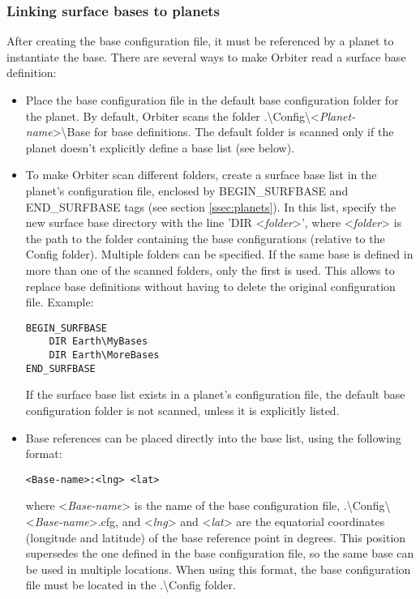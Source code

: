 \documentclass[Orbiter Developer Manual.tex]{subfiles}
\begin{document}
\subsubsection*{Linking surface bases to planets}
After creating the base configuration file, it must be referenced by a planet to instantiate the base. There are several ways to make Orbiter read a surface base definition:

\begin{itemize}
\item Place the base configuration file in the default base configuration folder for the planet. By default, Orbiter scans the folder .\textbackslash Config\textbackslash <\textit{Planet-name}>\textbackslash Base for base definitions. The default folder is scanned only if the planet doesn't explicitly define a base list (see below).
\item To make Orbiter scan different folders, create a surface base list in the planet's configuration file, enclosed by BEGIN\_SURFBASE and END\_SURFBASE tags (see section \ref{ssec:planets}). In this list, specify the new surface base directory with the line 'DIR <\textit{folder}>', where <\textit{folder}> is the path to the folder containing the base configurations (relative to the Config folder). Multiple folders can be specified. If the same base is defined in more than one of the scanned folders, only the first is used. This allows to replace base definitions without having to delete the original configuration file. Example:

\begin{lstlisting}[language=OSFS]
BEGIN_SURFBASE
	DIR Earth\MyBases
	DIR Earth\MoreBases
END_SURFBASE
\end{lstlisting}

\noindent
If the surface base list exists in a planet's configuration file, the default base configuration folder is not scanned, unless it is explicitly listed.
\item Base references can be placed directly into the base list, using the following format:\\

\begin{lstlisting}[language=OSFS]
<Base-name>:<lng> <lat>
\end{lstlisting}

\noindent
where <\textit{Base-name}> is the name of the base configuration file, .\textbackslash Config\textbackslash <\textit{Base-name}>.cfg, and <\textit{lng}> and <\textit{lat}> are the equatorial coordinates (longitude and latitude) of the base reference point in degrees. This position supersedes the one defined in the base configuration file, so the same base can be used in multiple locations. When using this format, the base configuration file must be located in the .\textbackslash Config folder.
\end{itemize}
\end{document}
